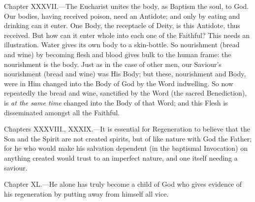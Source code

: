 Chapter XXXVII.—The Eucharist unites the body, as Baptism the soul, to God. Our bodies, having received poison, need an Antidote; and only by eating and drinking can it enter. One Body, the receptacle of Deity, is this Antidote, thus received. But how can it enter whole into each one of the Faithful? This needs an illustration. Water gives its own body to a skin-bottle. So nourishment (bread and wine) by becoming flesh and blood gives bulk to the human frame: the nourishment is the body. Just as in the case of other men, our Saviour’s nourishment (bread and wine) was His Body; but these, nourishment and Body, were in Him changed into the Body of God by the Word indwelling. So now repeatedly the bread and wine, sanctified by the Word (the sacred Benediction), is \emph{at the same time} changed into the Body of that Word; and this Flesh is disseminated amongst all the Faithful.

Chapters XXXVIII., XXXIX.—It is essential for Regeneration to believe that the Son and the Spirit are not created spirits, but of like nature with God the Father; for he who would make his salvation dependent (in the baptismal Invocation) on anything created would trust to an imperfect nature, and one itself needing a saviour.

Chapter XL.—He alone has truly become a child of God who gives evidence of his regeneration by putting away from himself all vice.


